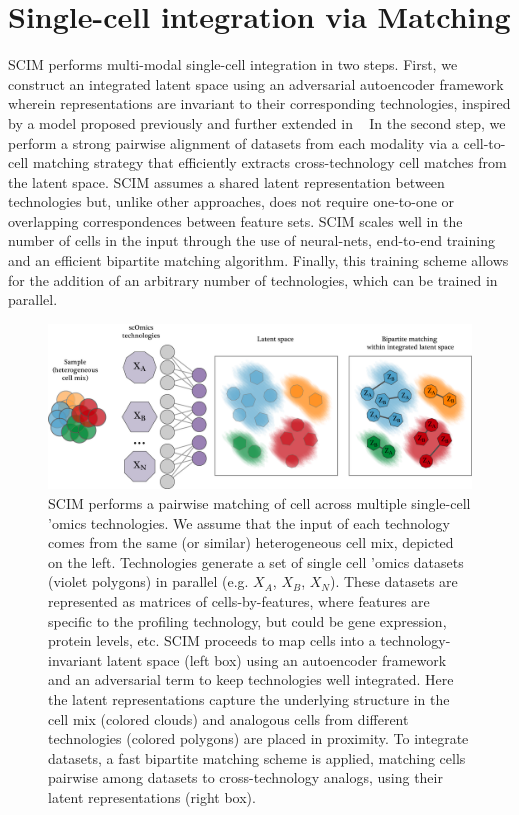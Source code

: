 
\section{Single-cell integration via Matching}
SCIM performs multi-modal single-cell integration in two steps.
First, we construct an integrated latent space using an adversarial autoencoder framework \cite{Makhzani2015} wherein representations are invariant to their corresponding technologies,
inspired by a model proposed previously \cite{Uhler2019} and further extended in ~\cite{Yang2019}
In the second step, we perform a strong pairwise alignment of datasets from each modality via a cell-to-cell matching strategy that efficiently extracts cross-technology cell matches from the latent space.
SCIM assumes a shared latent representation between technologies but, unlike other approaches, does not require one-to-one or overlapping correspondences between feature sets.
SCIM scales well in the number of cells in the input through the use of neural-nets, end-to-end training and an efficient bipartite matching algorithm.
Finally, this training scheme allows for the addition of an arbitrary number of technologies, which can be trained in parallel.

\begin{figure}[ht]
    \centering
    \includegraphics[width=\textwidth]{figures/integration/pipeline.png}
    \caption{
    SCIM performs a pairwise matching of cell across multiple single-cell 'omics technologies. We assume that the input of each technology comes from the same (or similar) heterogeneous cell mix, depicted on the left. Technologies generate a set of single cell 'omics datasets (violet polygons) in parallel (e.g. $X_A$, $X_B$, $X_N$).
    These datasets are represented as matrices of cells-by-features, where features are specific to the profiling technology, but could be gene expression, protein levels, etc.
    SCIM proceeds to map cells into a technology-invariant latent space (left box) using an autoencoder framework and an adversarial term to keep technologies well integrated.
    Here the latent representations capture the underlying structure in the cell mix (colored clouds) and analogous cells from different technologies (colored polygons) are placed in proximity.
    To integrate datasets, a fast bipartite matching scheme is applied, matching cells pairwise among datasets to cross-technology analogs, using their latent representations (right box).
    }
\end{figure}

